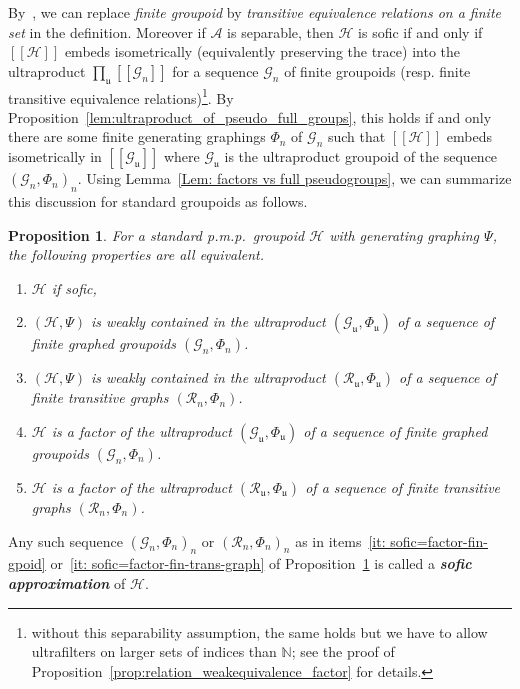 \documentclass[10pt]{amsart}
\newtheorem{prop}[cdrthm]{Proposition}
\theoremstyle{definition}
\newcommand{\defin}[1]{\textbf{\emph{#1}}}
\newcommand{\Nmath}{\mathbb{N}}
\newcommand{\RR}{\mathcal{R}}
\newcommand{\ch}{\mathcal{H}}
\newcommand{\cg}{\mathcal{G}}
\newcommand{\ra}{\mathscr{A}}
\newcommand{\ul}{\mathfrak{u}}
\newcommand{\pmp}{p.m.p.\ }
\begin{document}
By~\cite[Proposition~1.4]{Cordeiro-2017}, we can replace \emph{finite groupoid} by \emph{transitive equivalence relations on a finite set} in the definition. Moreover if $\ra$ is separable, then $\ch$ is sofic if and only if $[[\ch]]$ embeds isometrically (equivalently preserving the trace) into the ultraproduct $\prod_\ul[[\cg_n]]$ for a sequence $\cg_n$ of finite groupoids (resp. finite transitive equivalence relations)\footnote{without this separability assumption, the same holds but we have to allow ultrafilters on larger sets of indices than $\Nmath$; see the proof of Proposition~\ref{prop:relation_weakequivalence_factor} for details.}. By Proposition~\ref{lem:ultraproduct_of_pseudo_full_groups}, this holds if and only there are some finite generating graphings $\Phi_n$ of $\cg_n$ such that $[[\ch]]$ embeds isometrically in $[[\cg_\ul]]$ where $\cg_\ul$ is the ultraproduct groupoid of the sequence $(\cg_n,\Phi_n)_n$. Using Lemma~\ref{Lem: factors vs full pseudogroups}, we can summarize this discussion for standard groupoids as follows.

\begin{prop}\label{prop: sofic vs weak-cont and factors}
For a standard \pmp groupoid $\ch$ with generating graphing $\Psi$, the following properties are all equivalent.
\begin{enumerate}
\item \label{prop3.34.1}$\ch$ if sofic,
\item \label{prop3.34.2}$(\ch,\Psi)$ is weakly contained in the ultraproduct $(\cg_\ul,\Phi_\ul)$ of a sequence of finite graphed groupoids $(\cg_n,\Phi_n)$.
\item \label{prop3.34.3}$(\ch,\Psi)$ is weakly contained in the ultraproduct $(\RR_\ul,\Phi_\ul)$ of a sequence of finite transitive graphs $(\RR_n,\Phi_n)$.
\item \label{it: sofic=factor-fin-gpoid}
$\ch$ is a factor of the ultraproduct $(\cg_\ul,\Phi_\ul)$ of a sequence of finite graphed groupoids $(\cg_n,\Phi_n)$.
\item\label{it: sofic=factor-fin-trans-graph}
$\ch$ is a factor of the ultraproduct $(\RR_\ul,\Phi_\ul)$ of a sequence of finite transitive graphs $(\RR_n,\Phi_n)$.
\end{enumerate}
\end{prop}

Any such sequence $(\cg_n,\Phi_n)_n$ or $(\RR_n,\Phi_n)_n$ as in items~\eqref{it: sofic=factor-fin-gpoid} or~\eqref{it: sofic=factor-fin-trans-graph} of Proposition~\ref{prop: sofic vs weak-cont and factors} is called a
\defin{sofic approximation} of $\ch$.
\end{document}
